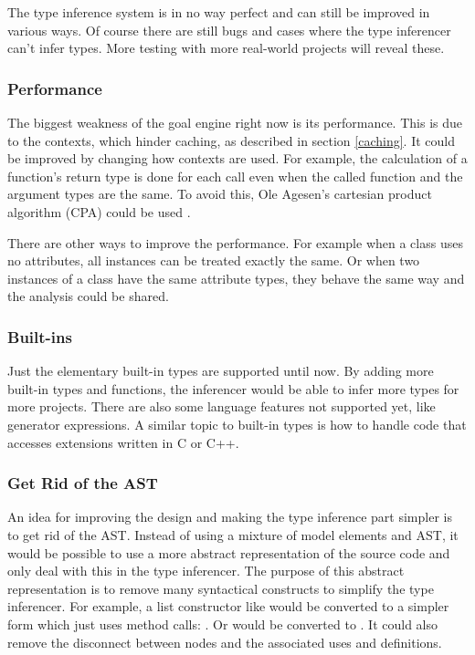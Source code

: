 \documentclass[12pt,halfparskip,DIV11,BCOR10mm]{scrreprt}
\begin{document}
The type inference system is in no way perfect and can still be improved in various ways. Of course there are still bugs and cases where the type inferencer can't infer types. More testing with more real-world projects will reveal these.

\subsubsection{Performance}

The biggest weakness of the goal engine right now is its performance. This is due to the contexts, which hinder caching, as described in section \vref{caching}. It could be improved by changing how contexts are used. For example, the calculation of a function's return type is done for each call even when the called function and the argument types are the same. To avoid this, Ole Agesen's cartesian product algorithm (CPA) could be used \cite{cpa}.

There are other ways to improve the performance. For example when a class uses no attributes, all instances can be treated exactly the same. Or when two instances of a class have the same attribute types, they behave the same way and the analysis could be shared.

\subsubsection{Built-ins}

Just the elementary built-in types are supported until now. By adding more built-in types and functions, the inferencer would be able to infer more types for more projects. There are also some language features not supported yet, like generator expressions. A similar topic to built-in types is how to handle code that accesses extensions written in C or C++.

\subsubsection{Get Rid of the AST}
\label{aast}

An idea for improving the design and making the type inference part simpler is to get rid of the AST. Instead of using a mixture of model elements and AST, it would be possible to use a more abstract representation of the source code and only deal with this in the type inferencer. The purpose of this abstract representation is to remove many syntactical constructs to simplify the type inferencer. For example, a list constructor like  would be converted to a simpler form which just uses method calls: . Or  would be converted to . It could also remove the disconnect between  nodes and the associated uses and definitions.
\end{document}
